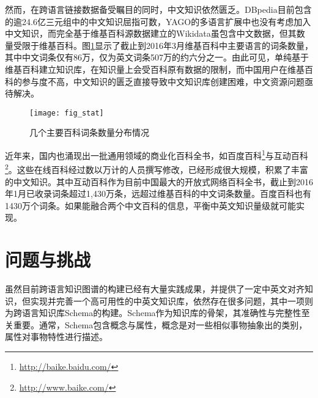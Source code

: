 然而，在跨语言链接数据备受瞩目的同时，中文知识依然匮乏。DBpedia目前包含的逾24.6亿三元组中的中文知识屈指可数，YAGO的多语言扩展中也没有考虑加入中文知识，而完全基于维基百科源数据建立的Wikidata虽包含中文数据，但其数量受限于维基百科。图\ref{fig:wiki-stat}显示了截止到2016年3月维基百科中主要语言的词条数量，其中中文词条仅有86万，仅为英文词条507万的约六分之一。由此可见，单纯基于维基百科建立知识库，在知识量上会受百科原有数据的限制，而中国用户在维基百科的参与度不高，中文知识的匮乏直接导致中文知识库创建困难，中文资源问题亟待解决。

\begin{figure}[H] %
  \centering
  \texttt{[image: fig\_stat]}
  \caption{几个主要百科词条数量分布情况}
  \label{fig:wiki-stat}
\end{figure}

近年来，国内也涌现出一批通用领域的商业化百科全书，如百度百科\footnote{\url{http://baike.baidu.com/}}与互动百科\footnote{\url{http://www.baike.com/}}。这些在线百科经过数以万计的人员撰写修改，已经形成很大规模，积累了丰富的中文知识。其中互动百科作为目前中国最大的开放式网络百科全书，截止到2016年1月已收录词条超过1,430万条，远超过维基百科的中文词条数量。百度百科也有1430万个词条。如果能融合两个中文百科的信息，平衡中英文知识量级就可能实现。


\section{问题与挑战}

虽然目前跨语言知识图谱的构建已经有大量实践成果，并提供了一定中英文对齐知识，但实现并完善一个高可用性的中英文知识库，依然存在很多问题，其中一项则为跨语言知识库Schema的构建。Schema作为知识库的骨架，其准确性与完整性至关重要。通常，Schema包含概念与属性，概念是对一些相似事物抽象出的类别，属性对事物特性进行描述。

